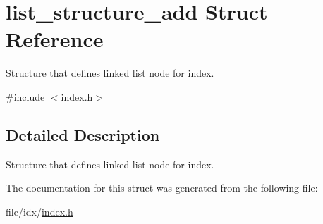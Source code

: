 \hypertarget{structlist__structure__add}{}\section{list\+\_\+structure\+\_\+add Struct Reference}
\label{structlist__structure__add}


Structure that defines linked list node for index.  




{\ttfamily \#include $<$index.\+h$>$}



\subsection{Detailed Description}
Structure that defines linked list node for index. 

The documentation for this struct was generated from the following file\+:\begin{DoxyCompactItemize}
\item 
file/idx/\hyperlink{index_8h}{index.\+h}\end{DoxyCompactItemize}
